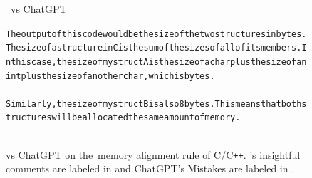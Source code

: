 \begin{figure}[H]
\begin{AIbox}{\DV~vs ChatGPT}
{\begin{alltt}
The output of this code would be the size of the two structures in bytes. The size of a structure in C is the sum of the sizes of all of its members. In this case, the size of mystruct\textunderscore A is the size of a char plus the size of an int plus the size of another char, which is  bytes. \\
\\
Similarly, the size of mystruct\textunderscore B is also 8 bytes. This means that both structures will be allocated the same amount of memory. \\
\\
\end{alltt}
}
\end{AIbox}
\caption{\DV vs ChatGPT on the~memory alignment rule of C/C\texttt{++}. \DV's insightful comments are labeled in  and ChatGPT's Mistakes are labeled in .}
\label{fig:code-memory-align}
\end{figure}


